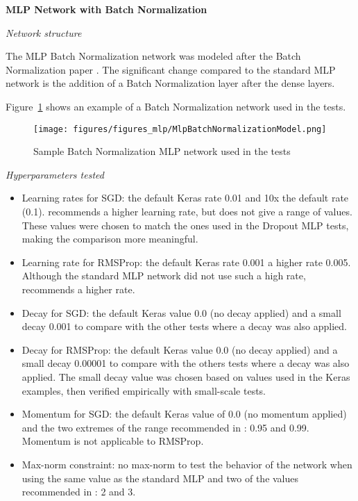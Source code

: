 \documentclass[../CAP6619_term_project_cgarbin.tex]{subfiles}
\begin{document}
\medskip
\textbf{MLP Network with Batch Normalization}

\smallskip
\textit{Network structure}

The MLP Batch Normalization network was modeled after the Batch Normalization paper \cite{Ioffe2015}. The significant change compared to the standard MLP network is the addition of a Batch Normalization layer after the dense layers.

Figure~\ref{fig:MlpBatchNormalizationModel} shows an example of a Batch Normalization network used in the tests.

\begin{figure}[htbp]
\centerline{\texttt{[image: figures/figures\_mlp/MlpBatchNormalizationModel.png]}}
\caption{Sample Batch Normalization MLP network used in the tests}
\label{fig:MlpBatchNormalizationModel}
\end{figure}

\medskip
\textit{Hyperparameters tested}

\begin{itemize}
\item Learning rates for SGD: the default Keras rate 0.01 and 10x the default rate (0.1). \cite{Ioffe2015} recommends a higher learning rate, but does not give a range of values. These values were chosen to match the ones used in the Dropout MLP tests, making the comparison more meaningful.
\item Learning rate for RMSProp: the default Keras rate 0.001 a higher rate 0.005. Although the standard MLP network did not use such a high rate, \cite{Ioffe2015} recommends a higher rate.
\item Decay for SGD: the default Keras value 0.0 (no decay applied) and a small decay 0.001 to compare with the other tests where a decay was also applied.
\item Decay for RMSProp: the default Keras value 0.0 (no decay applied) and a small decay 0.00001 to compare with the others tests where a decay was also applied. The small decay value was chosen based on values used in the Keras examples, then verified empirically with small-scale tests.
\item Momentum for SGD: the default Keras value of 0.0 (no momentum applied) and the two extremes of the range recommended in \cite{Srivastava2014}: 0.95 and 0.99.  Momentum is not applicable to RMSProp.
\item Max-norm constraint: no max-norm to test the behavior of the network when using the same value as the standard MLP and two of the values recommended in \cite{Srivastava2014}: 2 and 3.
\end{itemize}
\end{document}
